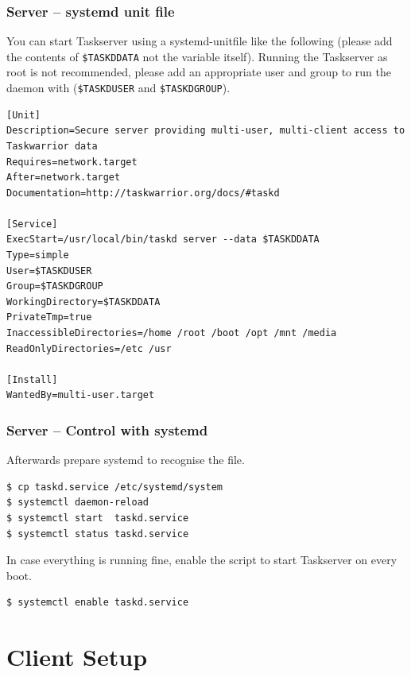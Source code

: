 \documentclass[t,handout]{beamer}
\begin{document}
\begin{frame}[fragile]\frametitle{Server -- systemd unit file}
    \vfill
    You can start Taskserver using a systemd-unitfile like the following (please add the contents of \verb+$TASKDDATA+ not the variable itself). Running the Taskserver as root is not recommended, please add an appropriate user and group to run the daemon with (\verb+$TASKDUSER+ and \verb+$TASKDGROUP+).

    \begin{lstlisting}
[Unit]
Description=Secure server providing multi-user, multi-client access to Taskwarrior data
Requires=network.target
After=network.target
Documentation=http://taskwarrior.org/docs/#taskd

[Service]
ExecStart=/usr/local/bin/taskd server --data $TASKDDATA
Type=simple
User=$TASKDUSER
Group=$TASKDGROUP
WorkingDirectory=$TASKDDATA
PrivateTmp=true
InaccessibleDirectories=/home /root /boot /opt /mnt /media
ReadOnlyDirectories=/etc /usr

[Install]
WantedBy=multi-user.target\end{lstlisting}
\end{frame}

\begin{frame}[fragile]\frametitle{Server -- Control with systemd}
    \vfill
    Afterwards prepare systemd to recognise the file.

    \begin{lstlisting}
$ cp taskd.service /etc/systemd/system
$ systemctl daemon-reload
$ systemctl start  taskd.service
$ systemctl status taskd.service\end{lstlisting}

    In case everything is running fine, enable the script to start Taskserver on every boot.

    \begin{lstlisting}
$ systemctl enable taskd.service\end{lstlisting}
\end{frame}

\section{Client Setup}
\end{document}
